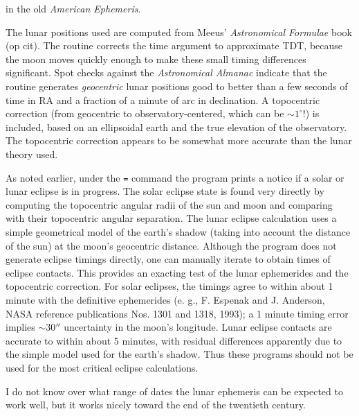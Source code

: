 in the old {\it American Ephemeris}.
\par
{}
\par
The lunar positions used are computed from Meeus' {\it Astronomical 
Formulae} book (op cit).
The routine corrects the time argument to approximate TDT, because the 
moon moves quickly enough to make these small timing differences significant.
Spot checks against the {\it Astronomical Almanac} indicate that the routine 
generates {\it geocentric} lunar positions good to better than a few 
seconds of time in RA and a fraction of a minute of arc in declination.  
A topocentric correction (from geocentric to observatory-centered, which 
can be $\sim 1^{\circ}$!) is included, based on an ellipsoidal earth and 
the true elevation of the observatory.  The topocentric correction appears 
to be somewhat more accurate than the lunar theory used.  

As noted earlier, under the {\tt =} command the program prints a notice if 
a solar or lunar eclipse is in progress.  The solar eclipse state is found 
very directly by computing the topocentric angular radii of the sun and moon 
and comparing with their topocentric angular separation.  The lunar eclipse 
calculation uses a simple geometrical model of the earth's shadow (taking 
into account the distance of the sun) at the moon's geocentric distance.  
Although the program does not generate eclipse timings directly, one can 
manually iterate to obtain times of eclipse contacts.  This provides an 
exacting test of the lunar ephemerides and the topocentric correction.  
For solar eclipses, the timings agree to within about 1 minute with the 
definitive ephemerides (e. g., F. Espenak and J. Anderson, NASA reference
publications Nos. 1301 and 1318, 1993); a 1 minute timing error implies 
$\sim 30''$ uncertainty in the moon's longitude.  Lunar eclipse contacts are
accurate to within about 5 minutes, with residual differences apparently 
due to the simple model used for the earth's shadow.  Thus these programs 
should not be used for the most critical eclipse calculations.

I do not know over what range of dates the lunar ephemeris can be expected 
to work well, but it works nicely toward the end of the twentieth century.

